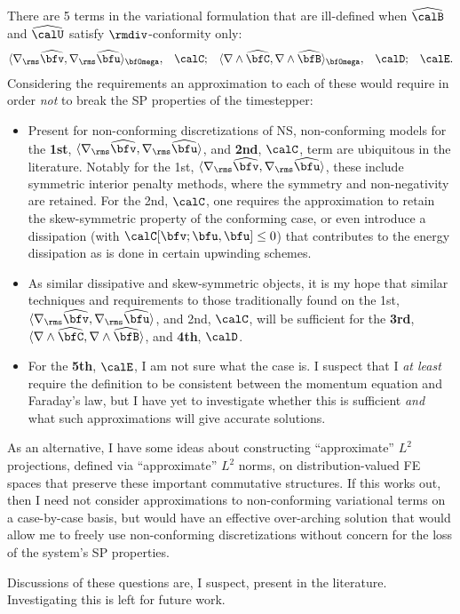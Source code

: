 \begin{remark}
        There are 5 terms in the variational formulation that are ill-defined when $\widehat{\calB}$ and $\widehat{\calU}$ satisfy $\rmdiv$-conformity only:
        \begin{align}
            \langle\nabla_{\rms}\widehat{\bfv}, \nabla_{\rms}\widehat{\bfu}\rangle_{\bfOmega},  &&
            \calC;  &&
            \langle\nabla\wedge\widehat{\bfC}, \nabla\wedge\widehat{\bfB}\rangle_{\bfOmega},  &&
            \calD;  &&
            \calE.
        \end{align}
        Considering the requirements an approximation to each of these would require in order \emph{not} to break the SP properties of the timestepper:
        \begin{itemize}
            \item  Present for non-conforming discretizations of NS, non-conforming models for the {\bf 1st}, $\langle\nabla_{\rms}\widehat{\bfv}, \nabla_{\rms}\widehat{\bfu}\rangle$, and {\bf 2nd}, $\calC$, term are ubiquitous in the literature. Notably for the 1st, $\langle\nabla_{\rms}\widehat{\bfv}, \nabla_{\rms}\widehat{\bfu}\rangle$, these include symmetric interior penalty methods, where the symmetry and non-negativity are retained. For the 2nd, $\calC$, one requires the approximation to retain the skew-symmetric property of the conforming case, or even introduce a dissipation (with $\calC[\bfv; \bfu, \bfu] \leq 0$) that contributes to the energy dissipation as is done in certain upwinding schemes.
            \item  As similar dissipative and skew-symmetric objects, it is my hope that similar techniques and requirements to those traditionally found on the 1st, $\langle\nabla_{\rms}\widehat{\bfv}, \nabla_{\rms}\widehat{\bfu}\rangle$, and 2nd, $\calC$, will be sufficient for the {\bf 3rd}, $\langle\nabla\wedge\widehat{\bfC}, \nabla\wedge\widehat{\bfB}\rangle$, and {\bf 4th}, $\calD$.
            \item  For the {\bf 5th}, $\calE$, I am not sure what the case is. I suspect that I \emph{at least} require the definition to be consistent between the momentum equation and Faraday's law, but I have yet to investigate whether this is sufficient \emph{and} what such approximations will give accurate solutions.
        \end{itemize}
        As an alternative, I have some ideas about constructing ``approximate'' $L^{2}$ projections, defined via ``approximate'' $L^{2}$ norms, on distribution-valued FE spaces that preserve these important commutative structures. If this works out, then I need not consider approximations to non-conforming variational terms on a case-by-case basis, but would have an effective over-arching solution that would allow me to freely use non-conforming discretizations without concern for the loss of the system's SP properties.

        Discussions of these questions are, I suspect, present in the literature. Investigating this is left for future work.
    \end{remark}
    